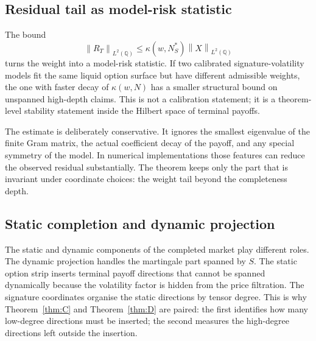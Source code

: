 \documentclass[11pt,oneside]{article}
\theoremstyle{plain}
\theoremstyle{definition}
\theoremstyle{remark}
\newcommand{\Q}{\mathbb{Q}}
\newcommand{\norm}[1]{\left\lVert #1\right\rVert}
\begin{document}
\subsection*{Residual tail as model-risk statistic}
The bound
\[
\norm{R_T}_{L^2(\Q)}\leq \kappa(w,N_S^\ast)\norm{X}_{L^2(\Q)}
\]
turns the weight into a model-risk statistic. If two calibrated signature-volatility models fit the same liquid option surface but have different admissible weights, the one with faster decay of $\kappa(w,N)$ has a smaller structural bound on unspanned high-depth claims. This is not a calibration statement; it is a theorem-level stability statement inside the Hilbert space of terminal payoffs.

The estimate is deliberately conservative. It ignores the smallest eigenvalue of the finite Gram matrix, the actual coefficient decay of the payoff, and any special symmetry of the model. In numerical implementations those features can reduce the observed residual substantially. The theorem keeps only the part that is invariant under coordinate choices: the weight tail beyond the completeness depth.

\subsection*{Static completion and dynamic projection}
The static and dynamic components of the completed market play different roles. The dynamic projection handles the martingale part spanned by $S$. The static option strip inserts terminal payoff directions that cannot be spanned dynamically because the volatility factor is hidden from the price filtration. The signature coordinates organise the static directions by tensor degree. This is why Theorem~\ref{thm:C} and Theorem~\ref{thm:D} are paired: the first identifies how many low-degree directions must be inserted; the second measures the high-degree directions left outside the insertion.



\end{document}
